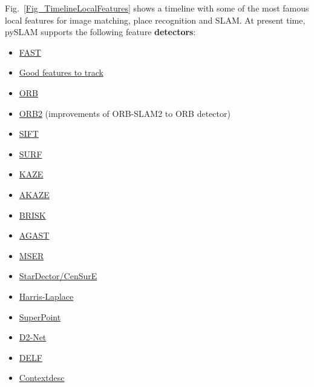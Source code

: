 \documentclass{article}
\begin{document}
Fig.~\ref{Fig_TimelineLocalFeatures} shows a timeline with some of the most famous local features for image matching, place recognition and SLAM. At present time, pySLAM supports the following feature \textbf{detectors}:

\begin{itemize}
    \item \href{https://www.edwardrosten.com/work/fast.html}{FAST} \cite{rosten2006machine}
    \item \href{https://ieeexplore.ieee.org/document/323794}{Good features to track} \cite{shi1994good}
    \item \href{http://www.willowgarage.com/sites/default/files/orb_final.pdf}{ORB} \cite{rublee2011orb}
    \item \href{https://github.com/raulmur/ORB_SLAM2}{ORB2} (improvements of ORB-SLAM2 to ORB detector)
    \item \href{https://www.cs.ubc.ca/~lowe/papers/iccv99.pdf}{SIFT} \cite{lowe1999object}
    \item \href{http://people.ee.ethz.ch/~surf/eccv06.pdf}{SURF} \cite{bay2006surf}
    \item \href{https://www.doc.ic.ac.uk/~ajd/Publications/alcantarilla_etal_eccv2012.pdf}{KAZE} \cite{alcantarilla2012kaze}
    \item \href{http://www.bmva.org/bmvc/2013/Papers/paper0013/paper0013.pdf}{AKAZE} \cite{alcantarilla2013fast}
    \item \href{http://www.margaritachli.com/papers/ICCV2011paper.pdf}{BRISK} \cite{leutenegger2011brisk}
    \item \href{http://www.i6.in.tum.de/Main/ResearchAgast}{AGAST}
    \item \href{http://cmp.felk.cvut.cz/~matas/papers/matas-bmvc02.pdf}{MSER} \cite{matas2002robust}
    \item \href{https://link.springer.com/content/pdf/10.1007%2F978-3-540-88693-8_8.pdf}{StarDector/CenSurE}
    \item \href{https://www.robots.ox.ac.uk/~vgg/research/affine/det_eval_files/mikolajczyk_ijcv2004.pdf}{Harris-Laplace}
    \item \href{https://github.com/MagicLeapResearch/SuperPointPretrainedNetwork}{SuperPoint}
    \item \href{https://github.com/mihaidusmanu/d2-net}{D2-Net} \cite{dusmanu2019d2}
    \item \href{https://github.com/tensorflow/models/tree/master/research/delf}{DELF} \cite{noh2017large}
    \item \href{https://github.com/lzx551402/contextdesc}{Contextdesc} \cite{luo2020contextdesc}

\end{itemize}
\end{document}
